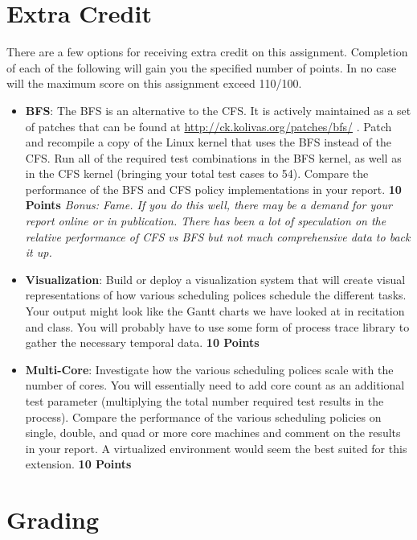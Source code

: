 \documentclass[12pt]{article}
\begin{document}
\section{Extra Credit}

There are a few options for receiving extra credit on this
assignment. Completion of each of the following will gain you the
specified number of points. In no case will the maximum score on
this assignment exceed 110/100.

\begin{itemize}
\item {\bf BFS}: The BFS is an alternative to the
  CFS. It is actively maintained as a set of patches that
  can be found at
  \url{http://ck.kolivas.org/patches/bfs/}
  \cite{Kolivas-BFS,Kolivas-BFSFAQ}. Patch
  and recompile a copy of the Linux kernel that uses the BFS instead
  of the CFS. Run all of the required test combinations in the BFS
  kernel, as well as in the CFS kernel (bringing your total test cases
  to 54). Compare the performance of the BFS and CFS policy
  implementations in your
  report. {\bf 10 Points} \emph{Bonus: Fame. If you do this well, there may
  be a demand for your report online or in publication. There has been
  a lot of speculation on the relative performance of CFS vs BFS but not
  much comprehensive data to back it up.}
\item {\bf Visualization}: Build or deploy a visualization system that
  will create visual representations of how various scheduling polices
  schedule the different tasks. Your output might look like the
  Gantt charts we have looked at in recitation and class. You will
  probably have to use some form of process trace library to gather the
  necessary temporal data. {\bf 10 Points}
\item {\bf Multi-Core}: Investigate how the various scheduling polices
  scale with the number of cores. You will essentially need to add core
  count as an additional test parameter (multiplying the total number
  required test
  results in the process). Compare the performance of the various
  scheduling policies on single, double, and quad or more core machines and
  comment on the results in your report. A virtualized environment
  would seem the best suited for this extension. {\bf 10 Points}
\end{itemize}

\section{Grading}
\end{document}

